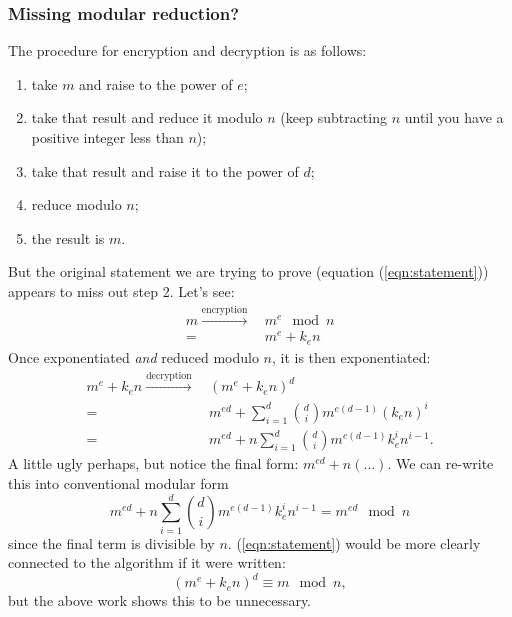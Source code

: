 \documentclass[]{scrartcl}
\theoremstyle{definition}
\let\oldref\ref
\renewcommand{\ref}[1]{(\oldref{#1})}
\begin{document}
\subsubsection{Missing modular reduction?}
The procedure for encryption and decryption is as follows:
\begin{enumerate}
    \item take $m$ and raise to the power of $e$;
    \item take that result and reduce it modulo $n$ (keep subtracting $n$ until you have a positive integer less than $n$);
    \item take that result and raise it to the power of $d$;
    \item reduce modulo $n$;
    \item the result is $m$.
\end{enumerate}
But the original statement we are trying to prove (equation \ref{eqn:statement}) appears to miss out step 2. Let's see:
\begin{align*}
    m \xrightarrow{\text{encryption}} &\,m^e \mod n \\
    =&\,m^e + k_en
\end{align*}
Once exponentiated \textit{and} reduced modulo $n$, it is then exponentiated:
\begin{align*}
    m^e + k_en \xrightarrow{\text{decryption}} &\,(m^e + k_en)^d \\
    =&\,m^{ed} + \sum_{i=1}^{d}\binom{d}{i} m^{e(d-1)}(k_en)^i \\
    =&\,m^{ed} + n\sum_{i=1}^{d}\binom{d}{i} m^{e(d-1)}k_e^in^{i-1}.
\end{align*}
A little ugly perhaps, but notice the final form: $m^{ed} + n(...)$. We can re-write this into conventional modular form
\begin{equation*}
    m^{ed} + n\sum_{i=1}^{d}\binom{d}{i} m^{e(d-1)}k_e^in^{i-1} = m^{ed} \mod n
\end{equation*}
since the final term is divisible by $n$. \ref{eqn:statement} would be more clearly connected to the algorithm if it were written:
\begin{equation*}
    (m^e + k_en)^d \equiv m \mod n,
\end{equation*}
but the above work shows this to be unnecessary.
\end{document}
